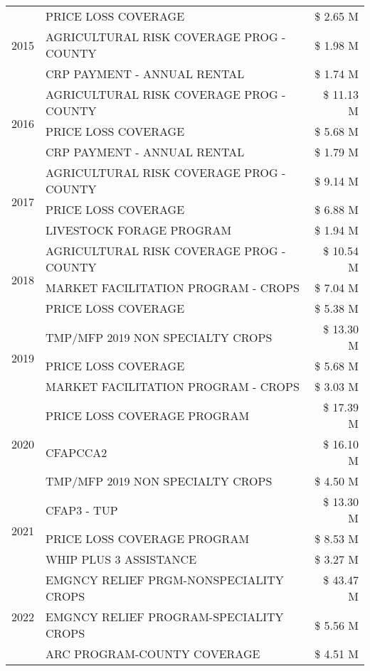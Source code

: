 \begin{tabular}{llr}
\multirow[t]{3}{*}{2015} & PRICE LOSS COVERAGE & \$ 2.65 M \\
 & AGRICULTURAL RISK COVERAGE PROG - COUNTY & \$ 1.98 M \\
 & CRP PAYMENT - ANNUAL RENTAL & \$ 1.74 M \\
\cline{1-3}
\multirow[t]{3}{*}{2016} & AGRICULTURAL RISK COVERAGE PROG - COUNTY & \$ 11.13 M \\
 & PRICE LOSS COVERAGE & \$ 5.68 M \\
 & CRP PAYMENT - ANNUAL RENTAL & \$ 1.79 M \\
\cline{1-3}
\multirow[t]{3}{*}{2017} & AGRICULTURAL RISK COVERAGE PROG - COUNTY & \$ 9.14 M \\
 & PRICE LOSS COVERAGE & \$ 6.88 M \\
 & LIVESTOCK FORAGE PROGRAM & \$ 1.94 M \\
\cline{1-3}
\multirow[t]{3}{*}{2018} & AGRICULTURAL RISK COVERAGE PROG - COUNTY & \$ 10.54 M \\
 & MARKET FACILITATION PROGRAM - CROPS & \$ 7.04 M \\
 & PRICE LOSS COVERAGE & \$ 5.38 M \\
\cline{1-3}
\multirow[t]{3}{*}{2019} & TMP/MFP 2019 NON SPECIALTY CROPS & \$ 13.30 M \\
 & PRICE LOSS COVERAGE & \$ 5.68 M \\
 & MARKET FACILITATION PROGRAM - CROPS & \$ 3.03 M \\
\cline{1-3}
\multirow[t]{3}{*}{2020} & PRICE LOSS COVERAGE PROGRAM & \$ 17.39 M \\
 & CFAPCCA2 & \$ 16.10 M \\
 & TMP/MFP 2019 NON SPECIALTY CROPS & \$ 4.50 M \\
\cline{1-3}
\multirow[t]{3}{*}{2021} & CFAP3 - TUP & \$ 13.30 M \\
 & PRICE LOSS COVERAGE PROGRAM & \$ 8.53 M \\
 & WHIP PLUS 3 ASSISTANCE & \$ 3.27 M \\
\cline{1-3}
\multirow[t]{3}{*}{2022} & EMGNCY RELIEF PRGM-NONSPECIALITY CROPS & \$ 43.47 M \\
 & EMGNCY RELIEF PROGRAM-SPECIALITY CROPS & \$ 5.56 M \\
 & ARC PROGRAM-COUNTY COVERAGE & \$ 4.51 M \\
\cline{1-3}
\bottomrule
\end{tabular}
